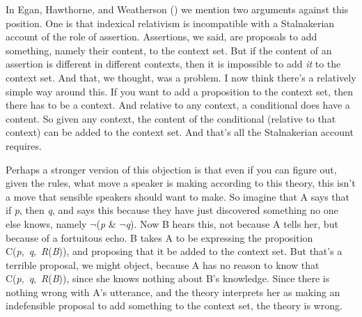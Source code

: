 \documentclass[
  11pt,
  letterpaper,
  DIV=11,
  numbers=noendperiod,
  oneside]{scrartcl}
\begin{document}
In Egan, Hawthorne, and Weatherson
() we mention two arguments against
this position. One is that indexical relativism is incompatible with a
Stalnakerian account of the role of assertion. Assertions, we said, are
proposals to add something, namely their content, to the context set.
But if the content of an assertion is different in different contexts,
then it is impossible to add \emph{it} to the context set. And that, we
thought, was a problem. I now think there's a relatively simple way
around this. If you want to add a proposition to the context set, then
there has to be a context. And relative to any context, a conditional
does have a content. So given any context, the content of the
conditional (relative to that context) can be added to the context set.
And that's all the Stalnakerian account requires.

Perhaps a stronger version of this objection is that even if you can
figure out, given the rules, what move a speaker is making according to
this theory, this isn't a move that sensible speakers should want to
make. So imagine that A says that if \emph{p}, then \emph{q}, and says
this because they have just discovered something no one else knows,
namely \(\neg\)(\emph{p} \& \(\neg\)\emph{q}). Now B hears this, not
because A tells her, but because of a fortuitous echo. B takes A to be
expressing the proposition C(\emph{p},~\emph{q},~\emph{R}(\emph{B})),
and proposing that it be added to the context set. But that's a terrible
proposal, we might object, because A has no reason to know that
C(\emph{p},~\emph{q},~\emph{R}(\emph{B})), since she knows nothing about
B's knowledge. Since there is nothing wrong with A's utterance, and the
theory interprets her as making an indefensible proposal to add
something to the context set, the theory is wrong.
\end{document}
